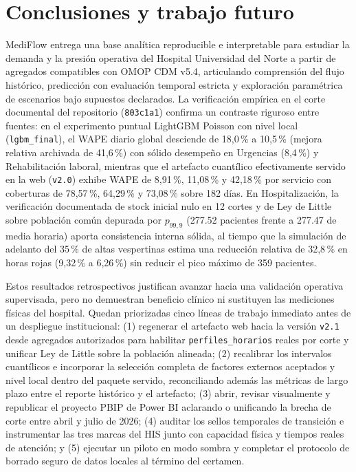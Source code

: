 
\section{Conclusiones y trabajo futuro}

MediFlow entrega una base analítica reproducible e interpretable para estudiar la demanda y la presión operativa del Hospital Universidad del Norte a partir de agregados compatibles con OMOP CDM v5.4, articulando comprensión del flujo histórico, predicción con evaluación temporal estricta y exploración paramétrica de escenarios bajo supuestos declarados. La verificación empírica en el corte documental del repositorio (\texttt{803c1a1}) confirma un contraste riguroso entre fuentes: en el experimento puntual LightGBM Poisson con nivel local (\texttt{lgbm\_final}), el WAPE diario global desciende de 18,0\,\% a 10,5\,\% (mejora relativa archivada de 41,6\,\%) con sólido desempeño en Urgencias (8,4\,\%) y Rehabilitación laboral, mientras que el artefacto cuantílico efectivamente servido en la web (\texttt{v2.0}) exhibe WAPE de 8,91\,\%, 11,08\,\% y 42,18\,\% por servicio con coberturas de 78,57\,\%, 64,29\,\% y 73,08\,\% sobre 182 días. En Hospitalización, la verificación documentada de stock inicial nulo en 12 cortes y de Ley de Little sobre población común depurada por $p_{99{,}9}$ (\num{277,52} pacientes frente a \num{277,47} de media horaria) aporta consistencia interna sólida, al tiempo que la simulación de adelanto del 35\,\% de altas vespertinas estima una reducción relativa de 32,8\,\% en horas rojas (9,32\,\% a 6,26\,\%) sin reducir el pico máximo de 359 pacientes.

Estos resultados retrospectivos justifican avanzar hacia una validación operativa supervisada, pero no demuestran beneficio clínico ni sustituyen las mediciones físicas del hospital. Quedan priorizadas cinco líneas de trabajo inmediato antes de un despliegue institucional: (1) regenerar el artefacto web hacia la versión \texttt{v2.1} desde agregados autorizados para habilitar \texttt{perfiles\_horarios} reales por corte y unificar Ley de Little sobre la población alineada; (2) recalibrar los intervalos cuantílicos e incorporar la selección completa de factores externos aceptados y nivel local dentro del paquete servido, reconciliando además las métricas de largo plazo entre el reporte histórico y el artefacto; (3) abrir, revisar visualmente y republicar el proyecto PBIP de Power BI aclarando o unificando la brecha de corte entre abril y julio de 2026; (4) auditar los sellos temporales de transición e instrumentar las tres marcas del HIS junto con capacidad física y tiempos reales de atención; y (5) ejecutar un piloto en modo sombra y completar el protocolo de borrado seguro de datos locales al término del certamen.
